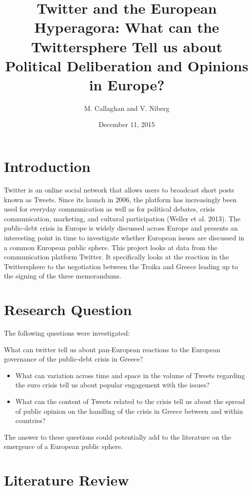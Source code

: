 \documentclass[]{article}
\title{Twitter and the European Hyperagora: What can the Twittersphere Tell us
about Political Deliberation and Opinions in Europe?}
\author{M. Callaghan and V. Niberg}
\date{December 11, 2015}
\begin{document}
\maketitle


{
\hypersetup{linkcolor=black}
\setcounter{tocdepth}{2}
\tableofcontents
}
\newpage

\section{Introduction}\label{introduction}

Twitter is an online social network that allows users to broadcast short
posts known as Tweets. Since its launch in 2006, the platform has
increasingly been used for everyday communication as well as for
political debates, crisis communication, marketing, and cultural
participation (Weller et al. 2013). The public-debt crisis in Europe is
widely discussed across Europe and presents an interesting point in time
to investigate whether European issues are discussed in a common
European public sphere. This project looks at data from the
communication platform Twitter. It specifically looks at the reaction in
the Twittersphere to the negotiation between the Troika and Greece
leading up to the signing of the three memorandums.

\section{Research Question}\label{research-question}

The following questions were investigated:

What can twitter tell us about pan-European reactions to the European
governance of the public-debt crisis in Greece?

\begin{itemize}
\item
  What can variation across time and space in the volume of Tweets
  regarding the euro crisis tell us about popular engagement with the
  issues?
\item
  What can the content of Tweets related to the crisis tell us about the
  spread of public opinion on the handling of the crisis in Greece
  between and within countries?
\end{itemize}

The answer to these questions could potentially add to the literature on
the emergence of a European public sphere.

\section{Literature Review}\label{literature-review}
\end{document}
